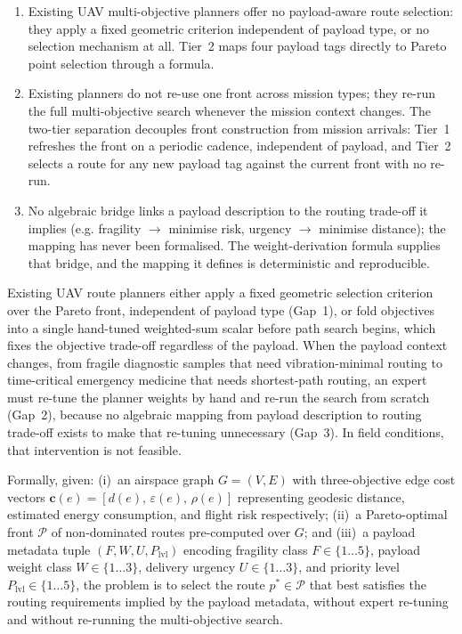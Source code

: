 \documentclass{ssnreview}
\newcommand{\flowchapter}[1]{\par\addvspace{30pt}{\let\clearpage\relax\chapter{#1}}}
\begin{document}
\begin{enumerate}[label=\textbf{Gap~\arabic*.}]
  \item Existing UAV multi-objective planners offer no payload-aware route selection:
  they apply a fixed geometric criterion independent of payload type, or no selection
  mechanism at all. Tier~2 maps four payload tags directly to Pareto point selection
  through a formula.
  \item Existing planners do not re-use one front across mission types; they re-run the
  full multi-objective search whenever the mission context changes. The two-tier
  separation decouples front construction from mission arrivals: Tier~1 refreshes the
  front on a periodic cadence, independent of payload, and Tier~2 selects a route for
  any new payload tag against the current front with no re-run.
  \item No algebraic bridge links a payload description to the routing trade-off it
  implies (e.g. fragility $\rightarrow$ minimise risk, urgency $\rightarrow$ minimise
  distance); the mapping has never been formalised. The weight-derivation formula
  supplies that bridge, and the mapping it defines is deterministic and reproducible.
\end{enumerate}

\flowchapter{Problem Statement}

Existing UAV route planners either apply a fixed geometric selection criterion over the
Pareto front, independent of payload type (Gap~1), or fold objectives into a single
hand-tuned weighted-sum scalar before path search begins, which fixes the objective
trade-off regardless of the payload. When the payload context changes, from fragile
diagnostic samples that need vibration-minimal routing to time-critical emergency
medicine that needs shortest-path routing, an expert must re-tune the planner weights by
hand and re-run the search from scratch (Gap~2), because no algebraic mapping from
payload description to routing trade-off exists to make that re-tuning unnecessary
(Gap~3). In field conditions, that intervention is not feasible.

Formally, given:
(i)~an airspace graph $G = (V, E)$ with three-objective edge cost vectors
$\mathbf{c}(e) = [d(e),\, \varepsilon(e),\, \rho(e)]$ representing geodesic distance,
estimated energy consumption, and flight risk respectively;
(ii)~a Pareto-optimal front $\mathcal{P}$ of non-dominated routes pre-computed over $G$;
and (iii)~a payload metadata tuple $(F, W, U, P_\mathrm{lvl})$ encoding fragility class
$F \in \{1\ldots5\}$, payload weight class $W \in \{1\ldots3\}$, delivery urgency
$U \in \{1\ldots3\}$, and priority level $P_\mathrm{lvl} \in \{1\ldots5\}$, the
problem is to select the route $p^* \in \mathcal{P}$ that best satisfies the routing
requirements implied by the payload metadata, without expert re-tuning and without
re-running the multi-objective search.
\end{document}
